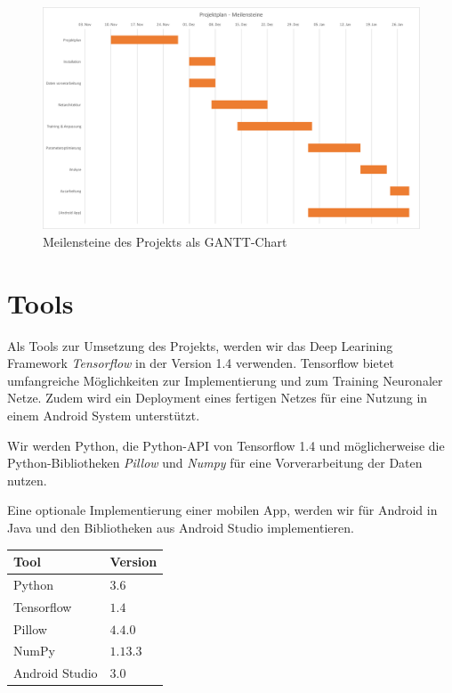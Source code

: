 \documentclass[%
   10pt,              %
   a4paper,           %
   DIV10,             %
]{scrartcl}%
\begin{document}
 \begin{figure}[ht]
	\centering
 \includegraphics[width=\textwidth]{fig/gantt_projektplan}
 \caption{Meilensteine des Projekts als GANTT-Chart}
	\label{fig_gantt}
 \end{figure}

\newpage
\section*{Tools}
Als Tools zur Umsetzung des Projekts, werden wir das Deep Learining Framework \textit{Tensorflow} \cite{tensorflow2015-whitepaper} in der Version 1.4 verwenden. Tensorflow bietet umfangreiche Möglichkeiten zur Implementierung und zum Training Neuronaler Netze. Zudem wird ein Deployment eines fertigen Netzes für eine Nutzung in einem Android System unterstützt.

Wir werden Python, die Python-API von Tensorflow 1.4 und möglicherweise die Python-Bibliotheken \textit{Pillow} und \textit{Numpy} \cite{numpy} für eine Vorverarbeitung der Daten nutzen.

Eine optionale Implementierung einer mobilen App, werden wir für Android in Java und den Bibliotheken aus Android Studio \cite{androidstudio} implementieren. 

\centering
\begin{tabular}{ll}
	\toprule
	Tool & Version \\
	\midrule
	Python & $3.6$  \\
	Tensorflow  & $1.4$   \\
	Pillow  & $4.4.0$    \\
	NumPy  & $1.13.3$    \\
	Android Studio  & $3.0$    \\
	\bottomrule
\end{tabular}
\end{document}

